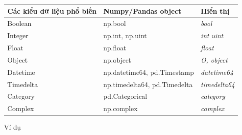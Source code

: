 \documentclass[
]{book}
\begin{document}
\begin{longtable}[]{@{}
  >{\raggedright\arraybackslash}p{}
  >{\raggedright\arraybackslash}p{}
  >{\raggedright\arraybackslash}p{}@{}}
\toprule
Các kiểu dữ liệu
phổ biến & Numpy/Pandas
object & Hiển thị \\
\midrule
\endhead
Boolean & np.bool & \emph{bool} \\
Integer & np.int,
np.uint & \emph{int}
\emph{uint} \\
Float & np.float & \emph{float} \\
Object & np.object & \emph{O, object} \\
Datetime & np.datetime64,
pd.Timestamp & \emph{datetime64} \\
Timedelta & np.timedelta64,
pd.Timedelta & \emph{timedelta64} \\
Category & pd.Categorical & \emph{category} \\
Complex & np.complex & \emph{complex} \\
\bottomrule
\end{longtable}

Ví dụ
\end{document}
